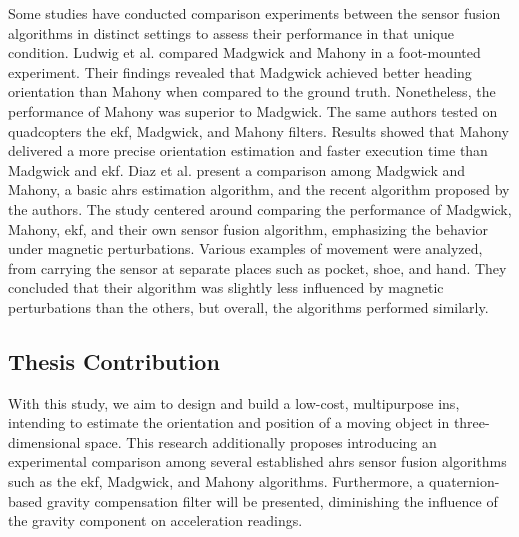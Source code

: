 Some studies have conducted comparison experiments between the sensor fusion algorithms in distinct settings to assess their performance in that unique condition. Ludwig et al. \cite{ludwig2018comparison} compared Madgwick and Mahony in a foot-mounted experiment. Their findings revealed that Madgwick achieved better heading orientation than Mahony when compared to the ground truth. Nonetheless, the performance of Mahony was superior to Madgwick. The same authors tested on \cite{ludwig2018comparisonuav} quadcopters the \acrshort{ekf}, Madgwick, and Mahony filters. Results showed that Mahony delivered a more precise orientation estimation and faster execution time than Madgwick and \acrshort{ekf}. Diaz et al. \cite{diaz2015evaluation} present a comparison among Madgwick and Mahony, a basic \acrshort{ahrs} estimation algorithm, and the recent algorithm proposed by the authors. The study centered around comparing the performance of Madgwick, Mahony, \acrshort{ekf}, and their own sensor fusion algorithm, emphasizing the behavior under magnetic perturbations. Various examples of movement were analyzed, from carrying the sensor at separate places such as pocket, shoe, and hand. They concluded that their algorithm was slightly less influenced by magnetic perturbations than the others, but overall, the algorithms performed similarly.



\subsection{Thesis Contribution}

With this study, we aim to design and build a low-cost, multipurpose \acrlong{ins}, intending to estimate the orientation and position of a moving object in three-dimensional space. This research additionally proposes introducing an experimental comparison among several established \acrshort{ahrs} sensor fusion algorithms such as the \acrshort{ekf}, Madgwick, and Mahony algorithms. Furthermore, a quaternion-based gravity compensation filter will be presented, diminishing the influence of the gravity component on acceleration readings.
